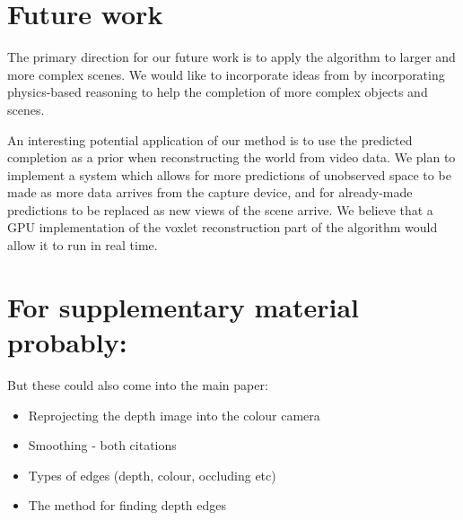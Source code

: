 \documentclass[10pt,twocolumn,letterpaper]{article}
\newcommand{\todo}[1]{\textcolor{red}{TODO: #1}}
\begin{document}

\section{Future work}


The primary direction for our future work is to apply the algorithm to larger and more complex scenes.
We would like to incorporate ideas from \cite{zheng-cvpr-2013, shao-siggraphasia-2014} by incorporating physics-based reasoning to help the completion of more complex objects and scenes.

An interesting potential application of our method is to use the predicted completion as a prior when reconstructing the world from video data.
We plan to implement a system which allows for more predictions of unobserved space to be made as more data arrives from the capture device, and for already-made predictions to be replaced as new views of the scene arrive.
We believe that a GPU implementation of the voxlet reconstruction part of the algorithm would allow it to run in real time.

\section{For supplementary material probably:}
But these could also come into the main paper:
\begin{itemize}
\item Reprojecting the depth image into the colour camera
\item Smoothing - both citations
\item Types of edges (depth, colour, occluding etc)
\item The method for finding depth edges
\end{itemize}



{\small


}

\end{document}
